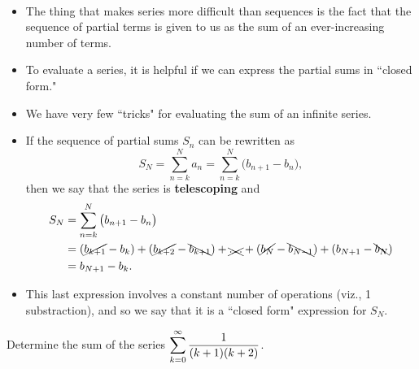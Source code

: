 \newpage

\begin{remark}\,
\begin{itemize}
\item The thing that makes series more difficult than sequences is the fact that the sequence of partial terms is given to us as the sum of an ever-increasing number of terms.
\item To evaluate a series, it is helpful if we can express the partial sums in ``closed form."
\item We have  very few ``tricks" for evaluating the sum of an infinite series.
\item If the sequence of partial sums $S_n$ can be rewritten as
\begin{equation*}
S_N = \sum_{n=k}^N a_n = \sum_{n=k}^N \big(b_{n+1} - b_n\big),
\end{equation*}
then we say that the series is \textbf{telescoping} and
\begin{equation*}
\begin{split}
S_N &= \sum_{n=k}^N \big(b_{n+1} - b_n\big)\\
& = (\cancel{b_{k+1}} - b_k) 
  + (\cancel{b_{k+2}} - \bcancel{b_{k+1}}) 
  + \xcancel{\dots} 
  + (\cancel{b_N} - \bcancel{b_{N-1}}) 
  + (b_{N+1} - \bcancel{b_N})\\
& = b_{N+1} - b_k.
\end{split}
\end{equation*}
\item This last expression involves a constant number of operations (viz., 1 substraction), and so we say that it is a ``closed form" expression for $S_N$.
\end{itemize}
\end{remark}

\newpage

\begin{example}
Determine the sum of the series $\displaystyle\sum_{k=0}^\infty \frac{1}{(k+1)(k+2)}$.
\end{example}

